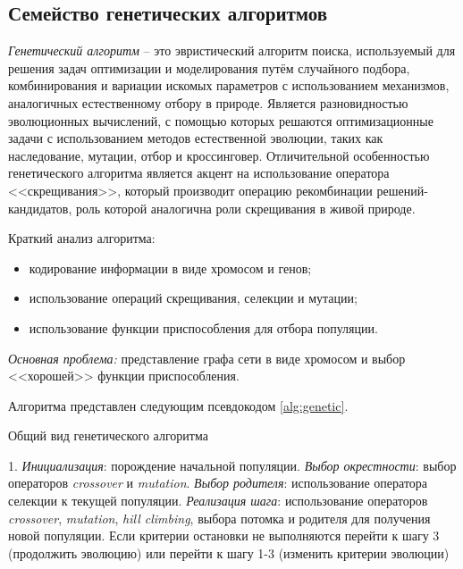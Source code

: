 \clearpage

\subsection{Семейство генетических алгоритмов}\label{sec:genetic}
\emph{Генетический алгоритм} -- это эвристический алгоритм поиска, используемый для решения задач оптимизации 
и моделирования путём случайного подбора, комбинирования и вариации искомых параметров с использованием 
механизмов, аналогичных естественному отбору в природе. Является разновидностью эволюционных вычислений, 
с помощью которых решаются оптимизационные задачи с использованием методов естественной эволюции, таких 
как наследование, мутации, отбор и кроссинговер. Отличительной особенностью генетического алгоритма является 
акцент на использование оператора <<скрещивания>>, который производит операцию рекомбинации 
решений-кандидатов, роль которой аналогична роли скрещивания в живой природе.

Краткий анализ алгоритма:
\begin{itemize}
    \item кодирование информации в виде хромосом и генов;
    \item использование операций скрещивания, селекции и мутации;
    \item использование функции приспособления для отбора популяции.
\end{itemize}

\emph{Основная проблема:} представление графа сети в виде хромосом и выбор <<хорошей>> функции приспособления.

Алгоритма представлен следующим псевдокодом \ref{alg:genetic}.

\begin{algorithm}[ht!]
    \caption{Общий вид генетического алгоритма}
    1. \emph{Инициализация}: порождение начальной популяции. \emph{Выбор окрестности}: выбор операторов \emph{crossover} и \emph{mutation}. \emph{Выбор родителя}: использование оператора селекции к текущей популяции. \emph{Реализация шага}: использование операторов \emph{crossover}, 
        \emph{mutation}, \emph{hill climbing}, выбора потомка и родителя для получения 
        новой популяции. Если критерии остановки не выполняются перейти к шагу 3 (продолжить эволюцию) 
        или перейти к шагу 1-3 (изменить критерии эволюции)\;
    \label{alg:genetic}
\end{algorithm}

\clearpage

